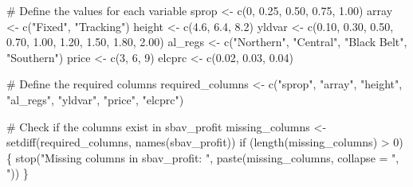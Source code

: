 \documentclass[
  letterpaper,
  DIV=11,
  numbers=noendperiod]{scrartcl}
\newenvironment{Shaded}{\begin{snugshade}}{\end{snugshade}}
\newcommand{\AttributeTok}[1]{\textcolor[rgb]{0.40,0.45,0.13}{#1}}
\newcommand{\CommentTok}[1]{\textcolor[rgb]{0.37,0.37,0.37}{#1}}
\newcommand{\ControlFlowTok}[1]{\textcolor[rgb]{0.00,0.23,0.31}{#1}}
\newcommand{\DecValTok}[1]{\textcolor[rgb]{0.68,0.00,0.00}{#1}}
\newcommand{\FloatTok}[1]{\textcolor[rgb]{0.68,0.00,0.00}{#1}}
\newcommand{\FunctionTok}[1]{\textcolor[rgb]{0.28,0.35,0.67}{#1}}
\newcommand{\NormalTok}[1]{\textcolor[rgb]{0.00,0.23,0.31}{#1}}
\newcommand{\OtherTok}[1]{\textcolor[rgb]{0.00,0.23,0.31}{#1}}
\newcommand{\SpecialCharTok}[1]{\textcolor[rgb]{0.37,0.37,0.37}{#1}}
\newcommand{\StringTok}[1]{\textcolor[rgb]{0.13,0.47,0.30}{#1}}
\begin{document}
\begin{Shaded}
\begin{Highlighting}[]
\CommentTok{\# Define the values for each variable}
\NormalTok{sprop }\OtherTok{\textless{}{-}} \FunctionTok{c}\NormalTok{(}\DecValTok{0}\NormalTok{, }\FloatTok{0.25}\NormalTok{, }\FloatTok{0.50}\NormalTok{, }\FloatTok{0.75}\NormalTok{, }\FloatTok{1.00}\NormalTok{)}
\NormalTok{array }\OtherTok{\textless{}{-}} \FunctionTok{c}\NormalTok{(}\StringTok{"Fixed"}\NormalTok{, }\StringTok{"Tracking"}\NormalTok{)}
\NormalTok{height }\OtherTok{\textless{}{-}} \FunctionTok{c}\NormalTok{(}\FloatTok{4.6}\NormalTok{, }\FloatTok{6.4}\NormalTok{, }\FloatTok{8.2}\NormalTok{)}
\NormalTok{yldvar }\OtherTok{\textless{}{-}} \FunctionTok{c}\NormalTok{(}\FloatTok{0.10}\NormalTok{, }\FloatTok{0.30}\NormalTok{, }\FloatTok{0.50}\NormalTok{, }\FloatTok{0.70}\NormalTok{, }\FloatTok{1.00}\NormalTok{, }\FloatTok{1.20}\NormalTok{, }\FloatTok{1.50}\NormalTok{, }\FloatTok{1.80}\NormalTok{, }\FloatTok{2.00}\NormalTok{)}
\NormalTok{al\_regs }\OtherTok{\textless{}{-}} \FunctionTok{c}\NormalTok{(}\StringTok{"Northern"}\NormalTok{, }\StringTok{"Central"}\NormalTok{, }\StringTok{"Black Belt"}\NormalTok{, }\StringTok{"Southern"}\NormalTok{)}
\NormalTok{price }\OtherTok{\textless{}{-}} \FunctionTok{c}\NormalTok{(}\DecValTok{3}\NormalTok{, }\DecValTok{6}\NormalTok{, }\DecValTok{9}\NormalTok{)}
\NormalTok{elcprc }\OtherTok{\textless{}{-}} \FunctionTok{c}\NormalTok{(}\FloatTok{0.02}\NormalTok{, }\FloatTok{0.03}\NormalTok{, }\FloatTok{0.04}\NormalTok{)}

\CommentTok{\# Define the required columns}
\NormalTok{required\_columns }\OtherTok{\textless{}{-}} \FunctionTok{c}\NormalTok{(}\StringTok{"sprop"}\NormalTok{, }\StringTok{"array"}\NormalTok{, }\StringTok{"height"}\NormalTok{, }
                      \StringTok{"al\_regs"}\NormalTok{, }\StringTok{"yldvar"}\NormalTok{, }\StringTok{"price"}\NormalTok{, }\StringTok{"elcprc"}\NormalTok{)}

\CommentTok{\# Check if the columns exist in sbav\_profit}
\NormalTok{missing\_columns }\OtherTok{\textless{}{-}} \FunctionTok{setdiff}\NormalTok{(required\_columns, }
                           \FunctionTok{names}\NormalTok{(sbav\_profit))}
\ControlFlowTok{if}\NormalTok{ (}\FunctionTok{length}\NormalTok{(missing\_columns) }\SpecialCharTok{\textgreater{}} \DecValTok{0}\NormalTok{) \{}
  \FunctionTok{stop}\NormalTok{(}\StringTok{"Missing columns in sbav\_profit: "}\NormalTok{,}
       \FunctionTok{paste}\NormalTok{(missing\_columns, }\AttributeTok{collapse =} \StringTok{", "}\NormalTok{))}
\NormalTok{\}}


\end{Highlighting}
\end{Shaded}
\end{document}
